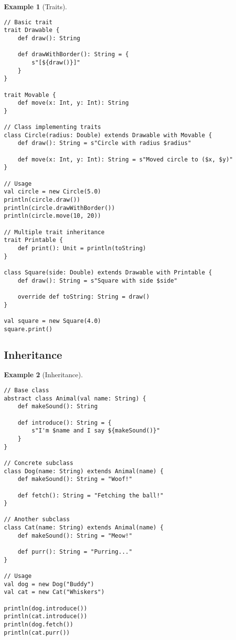 \documentclass[11pt]{article}
\newtheorem{example}{Example}[section]
\begin{document}
\begin{example}[Traits]
\begin{lstlisting}
// Basic trait
trait Drawable {
    def draw(): String
    
    def drawWithBorder(): String = {
        s"[${draw()}]"
    }
}

trait Movable {
    def move(x: Int, y: Int): String
}

// Class implementing traits
class Circle(radius: Double) extends Drawable with Movable {
    def draw(): String = s"Circle with radius $radius"
    
    def move(x: Int, y: Int): String = s"Moved circle to ($x, $y)"
}

// Usage
val circle = new Circle(5.0)
println(circle.draw())
println(circle.drawWithBorder())
println(circle.move(10, 20))

// Multiple trait inheritance
trait Printable {
    def print(): Unit = println(toString)
}

class Square(side: Double) extends Drawable with Printable {
    def draw(): String = s"Square with side $side"
    
    override def toString: String = draw()
}

val square = new Square(4.0)
square.print()
\end{lstlisting}
\end{example}

\subsection{Inheritance}

\begin{example}[Inheritance]
\begin{lstlisting}
// Base class
abstract class Animal(val name: String) {
    def makeSound(): String
    
    def introduce(): String = {
        s"I'm $name and I say ${makeSound()}"
    }
}

// Concrete subclass
class Dog(name: String) extends Animal(name) {
    def makeSound(): String = "Woof!"
    
    def fetch(): String = "Fetching the ball!"
}

// Another subclass
class Cat(name: String) extends Animal(name) {
    def makeSound(): String = "Meow!"
    
    def purr(): String = "Purring..."
}

// Usage
val dog = new Dog("Buddy")
val cat = new Cat("Whiskers")

println(dog.introduce())
println(cat.introduce())
println(dog.fetch())
println(cat.purr())
\end{lstlisting}
\end{example}
\end{document}
